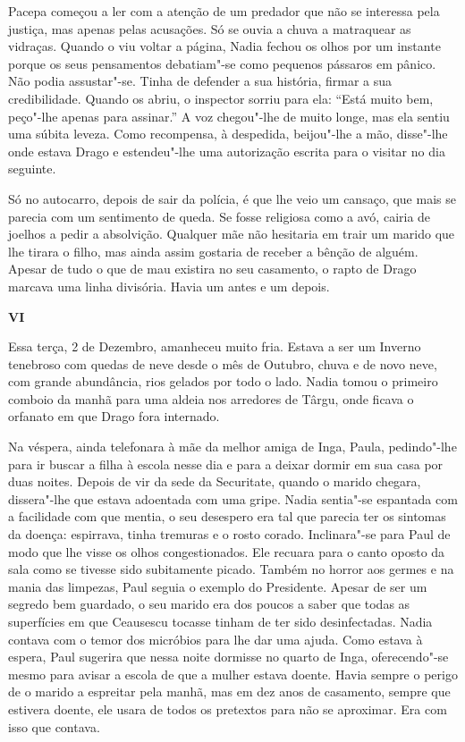 Pacepa começou a ler com a atenção de um predador que não se interessa
pela justiça, mas apenas pelas acusações. Só se ouvia a chuva a
matraquear as vidraças. Quando o viu voltar a página, Nadia fechou os
olhos por um instante porque os seus pensamentos debatiam"-se como
pequenos pássaros em pânico. Não podia assustar"-se. Tinha de defender a sua história, firmar a sua credibilidade.
Quando os abriu, o inspector sorriu para ela:
``Está muito bem, peço"-lhe apenas para assinar.'' A voz chegou"-lhe de
muito longe, mas ela sentiu uma súbita leveza. Como recompensa, à
despedida, beijou"-lhe a mão, disse"-lhe onde estava Drago e estendeu"-lhe
uma autorização escrita para o visitar no dia seguinte.

Só no autocarro, depois de sair da polícia, é que lhe veio um cansaço,
que mais se parecia com um sentimento de queda. Se fosse religiosa como
a avó, cairia de joelhos
a pedir a absolvição. Qualquer mãe não hesitaria em trair um marido que
lhe tirara o filho, mas ainda assim gostaria de receber a bênção de
alguém. Apesar de tudo o que de mau existira no seu casamento, o rapto
de Drago marcava uma linha divisória. Havia um antes e um depois.

\pagebreak
\thispagestyle{empty}
\movetooddpage
\vspace*{1.8cm}
\noindent{}\textbf{VI}

\bigskip

Essa terça, 2 de Dezembro, amanheceu muito fria. Estava a ser um Inverno
tenebroso com quedas de neve desde o mês de Outubro, chuva e de novo
neve, com grande abundância, rios gelados por todo o lado. Nadia tomou o
primeiro comboio da manhã para uma aldeia nos arredores de Târgu, onde
ficava o orfanato em que Drago fora internado.

Na véspera, ainda telefonara à mãe da melhor amiga de Inga, Paula,
pedindo"-lhe para ir buscar a filha à escola nesse dia e para a deixar
dormir em sua casa por duas noites. Depois de vir da sede da Securitate,
quando o marido chegara, dissera"-lhe que estava adoentada com uma gripe.
Nadia sentia"-se espantada com a facilidade com que mentia, o seu
desespero era tal que parecia ter os sintomas da doença: espirrava,
tinha tremuras e o rosto corado. Inclinara"-se para Paul de modo que lhe
visse os olhos congestionados. Ele recuara para o canto oposto da sala
como se tivesse sido subitamente picado. Também no horror aos germes e
na mania das limpezas, Paul seguia o exemplo do Presidente. Apesar de
ser um segredo bem
guardado, o seu marido era dos poucos a saber que todas as superfícies
em que Ceausescu tocasse tinham de ter sido desinfectadas. Nadia contava
com o temor dos micróbios para lhe dar uma ajuda. Como estava à espera,
Paul sugerira que nessa noite dormisse no quarto de Inga, oferecendo"-se mesmo para avisar a escola de que a mulher estava doente. Havia
sempre o perigo de o marido a espreitar pela manhã, mas em dez anos de
casamento, sempre que estivera doente, ele usara de todos os pretextos
para não se aproximar. Era com isso que contava.

